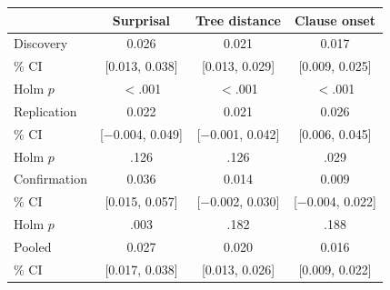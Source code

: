 \setlength{\tabcolsep}{3pt}\begin{tabular}{@{}lccc@{}}
\toprule
 & Surprisal & Tree distance & Clause onset \\
\midrule
Discovery & 0.026 & 0.021 & 0.017 \\
\quad 95\% CI & [0.013, 0.038] & [0.013, 0.029] & [0.009, 0.025] \\
\quad Holm $p$ & $<$.001 & $<$.001 & $<$.001 \\[2pt]
Replication & 0.022 & 0.021 & 0.026 \\
\quad 95\% CI & [$-$0.004, 0.049] & [$-$0.001, 0.042] & [0.006, 0.045] \\
\quad Holm $p$ & .126 & .126 & .029 \\[2pt]
Confirmation & 0.036 & 0.014 & 0.009 \\
\quad 95\% CI & [0.015, 0.057] & [$-$0.002, 0.030] & [$-$0.004, 0.022] \\
\quad Holm $p$ & .003 & .182 & .188 \\[2pt]
Pooled & 0.027 & 0.020 & 0.016 \\
\quad 95\% CI & [0.017, 0.038] & [0.013, 0.026] & [0.009, 0.022] \\
\bottomrule
\end{tabular}
